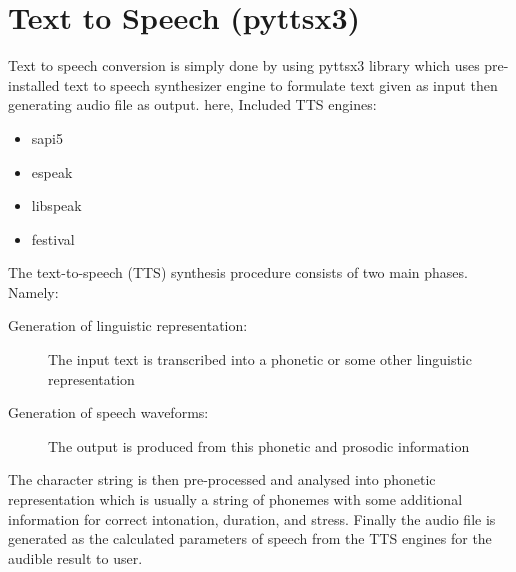         \section{Text to Speech (pyttsx3)}
	        Text to speech conversion is simply done by using pyttsx3 library which uses pre-installed text to speech synthesizer engine to formulate text given as input then generating audio file as output.
	        here, Included TTS engines:
            \begin{itemize}
                \item sapi5
                \item espeak
                \item libspeak
                \item festival
            \end{itemize}
            The text-to-speech (TTS) synthesis procedure consists of two main phases.
            \\Namely: 
                \begin{description}
                    \item[Generation of linguistic representation:] The input text is transcribed into a phonetic or some other linguistic representation
                    \item[Generation of speech waveforms:] The output is produced from this phonetic and prosodic information
                \end{description}
            The character string is then pre-processed and analysed into phonetic representation which is usually a string of phonemes with some additional information for correct intonation, duration, and stress.  Finally the audio file is generated as the calculated parameters of speech from the TTS engines for the audible result to user.
            \pagebreak
